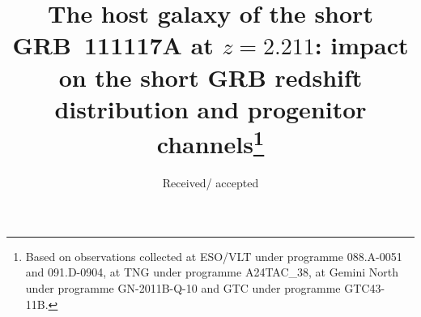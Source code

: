 \documentclass[referee]{aa}
\providecommand{\DIFdelbegin}{} %
\newcommand{\DIFscaledelfig}{0.5}
\newlength{\DIFdelgraphicswidth} %
\newlength{\DIFdelgraphicsheight} %
\newcommand{\DIFdelincludegraphics}[2][]{%
\sbox{\DIFdelgraphicsbox}{\DIFOincludegraphics[#1]{#2}}%
\settoboxwidth{\DIFdelgraphicswidth}{\DIFdelgraphicsbox} %
\settoboxtotalheight{\DIFdelgraphicsheight}{\DIFdelgraphicsbox} %
\scalebox{\DIFscaledelfig}{%
\parbox[b]{\DIFdelgraphicswidth}{\usebox{\DIFdelgraphicsbox}\\[-\baselineskip] \rule{\DIFdelgraphicswidth}{0em}}\llap{\resizebox{\DIFdelgraphicswidth}{\DIFdelgraphicsheight}{%
\setlength{\unitlength}{\DIFdelgraphicswidth}%
\begin{picture}(1,1)%
\thicklines\linethickness{2pt} %
{\color[rgb]{1,0,0}\put(0,0){\framebox(1,1){}}}%
{\color[rgb]{1,0,0}\put(0,0){\line( 1,1){1}}}%
{\color[rgb]{1,0,0}\put(0,1){\line(1,-1){1}}}%
\end{picture}%
}\hspace*{3pt}}} %
} %
\DeclareRobustCommand{\DIFdelbegin}{\DIFOdelbegin \let\includegraphics\DIFdelincludegraphics} %
\begin{document}
\title{The host galaxy of the short GRB~111117A at $z = 2.211$: impact on the short GRB redshift distribution and progenitor channels\thanks{Based on observations collected at ESO/VLT under programme 088.A-0051 and 091.D-0904, at TNG under programme A24TAC\_38, at Gemini North under programme GN-2011B-Q-10 and GTC under programme GTC43-11B.}}





\date{Received/ accepted}




\DIFdelbegin %


\end{document}
